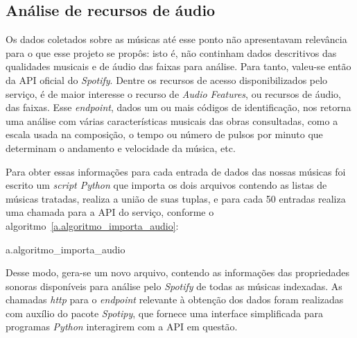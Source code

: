 \subsection{Análise de recursos de áudio}
\label{c.analise_audio}

Os dados coletados sobre as músicas até esse ponto não apresentavam relevância para o que esse projeto se propôs: isto é, não continham dados descritivos das qualidades musicais e de áudio das faixas para análise. Para tanto, valeu-se então da API oficial do \textit{Spotify}. Dentre os recursos de acesso disponibilizados pelo serviço, é de maior interesse o recurso de \textit{Audio Features}, ou recursos de áudio, das faixas. Esse \textit{endpoint}, dados um ou mais códigos de identificação, nos retorna uma análise com várias características musicais das obras consultadas, como a escala usada na composição, o tempo ou número de pulsos por minuto que determinam o andamento e velocidade da música, etc.

Para obter essas informações para cada entrada de dados das nossas músicas foi escrito um \textit{script Python} que importa os dois arquivos contendo as listas de músicas tratadas, realiza a união de suas tuplas, e para cada 50 entradas realiza uma chamada para a API do serviço, conforme o algoritmo~\ref{a.algoritmo_importa_audio}:

\begin{nicealgo}{a.algoritmo_importa_audio}
\naPREAMBLE
{}
\naBODY
\naBEGIN{}
	\naEND{}
	\naEND{}
\naEND{}
\end{nicealgo}

Desse modo, gera-se um novo arquivo, contendo as informações das propriedades sonoras disponíveis para análise pelo \textit{Spotify} de todas as músicas indexadas. As chamadas \textit{http} para o \textit{endpoint} relevante à obtenção dos dados foram realizadas com auxílio do pacote \textit{Spotipy}, que fornece uma interface simplificada para programas \textit{Python} interagirem com a API em questão.

